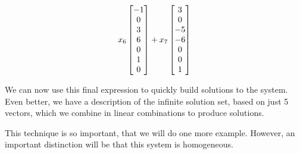 \documentclass{ximera}
\begin{document}
\begin{example}
\begin{align*}
    x_6\begin{bmatrix}-1\\0\\3\\6\\0\\1\\0\end{bmatrix}+
    x_7\begin{bmatrix}3\\0\\-5\\-6\\0\\0\\1\end{bmatrix}\\
  \end{align*}
  
  We can now use this final expression to quickly build solutions to
  the system.  Even better, we have a description of the infinite
  solution set, based on just 5 vectors, which we combine in linear
  combinations to produce solutions.
\end{example}

This technique is so important, that we will do one more example.
However, an important distinction will be that this system is
homogeneous.
\end{document}
